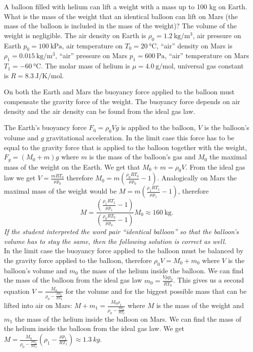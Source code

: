 A balloon filled with helium can lift a weight with a mass up to 100 kg on Earth. What is the mass of the weight that an identical balloon can lift on Mars (the mass of the balloon is included in the mass of the weight)? The volume of the weight is negligible. The air density on Earth is $\rho_0=\SI{1.2}{\kilogram\per\meter^3}$, air pressure on Earth $p_0=\SI{100}{\kilo\pascal}$, air temperature on $T_0=\SI{20}{\degreeCelsius}$, “air” density on Mars is $\rho_1=\SI{0.015}{\kilogram\per\meter^3}$, “air” pressure on Mars $p_1=\SI{600}{\pascal}$, “air” temperature on Mars $T_1=\SI{-60}{\degreeCelsius}$. The molar mass of helium is $\mu=\SI{4.0}{\gram\per\mole}$, universal gas constant is $R=\SI{8.3}{\joule\per\kelvin\per\mole}$.

\hinteng
On both the Earth and Mars the buoyancy force applied to the balloon must compensate the gravity force of the weight. The buoyancy force depends on air density and the air density can be found from the ideal gas law.

\solueng
The Earth’s buoyancy force $F_{ü}=\rho_0Vg$ is applied to the balloon, $V$ is the balloon’s volume and $g$ gravitational acceleration. In the limit case this force has to be equal to the gravity force that is applied to the balloon together with the weight, $F_g=(M_0+m)g$ where $m$ is the mass of the balloon’s gas and $M_0$ the maximal mass of the weight on the Earth. We get that $M_0+m=\rho_0V$. From the ideal gas law we get $V=\frac{mRT_0}{\mu p_0}$ therefore $M_0=m(\frac{\rho_0 RT_0}{\mu p_0}-1)$. Analogically on Mars the maximal mass of the weight would be $M=m(\frac{\rho_1RT_1}{\mu p_1}-1)$, therefore
\[M=\frac{(\frac{\rho_1RT_1}{\mu p_1}-1)}{(\frac{\rho_0RT_0}{\mu p_0}-1)}M_0\approx \SI{160}{\kilogram}.\] 
\emph{If the student interpreted the word pair “identical balloon” so that the balloon’s volume has to stay the same, then the following solution is correct as well.}\\
In the limit case the buoyancy force applied to the balloon must be balanced by the gravity force applied to the balloon, therefore $\rho_0 V=M_0+m_0$ where $V$ is the balloon’s volume and $m_0$ the mass of the helium inside the balloon. We can find the mass of the balloon from the ideal gas law $m_0=\frac{V\mu p_0}{RT_0}$. This gives us a second equation $V=\frac{M_0}{\rho_0-\frac{\mu p_0}{RT_0}}$ for the volume and for the biggest possible mass that can be lifted into air on Mars: $M+m_1=\frac{M_0\rho_1}{\rho_0-\frac{\mu p_0}{RT_0}}$ where $M$ is the mass of the weight and $m_1$ the mass of the helium inside the balloon on Mars. We can find the mass of the helium inside the balloon from the ideal gas law. We get $M=\frac{M_0}{\rho_0-\frac{\mu p_0}{RT_0}}(\rho_1-\frac{\mu p_1}{RT_1})\approx \SI{1,3}{kg}$.
\probend